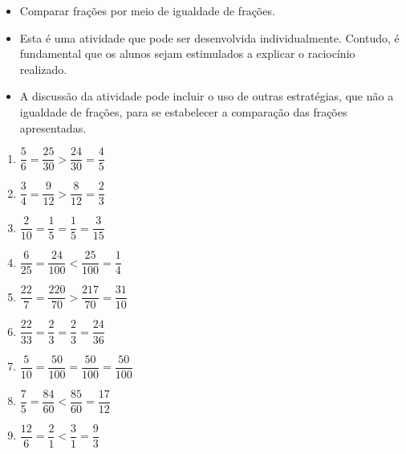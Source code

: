 \begin{atividade}\label{chap4-ativ13}
\objetivos
\begin{itemize} %
    \item       Comparar frações por meio de igualdade de frações.
\end{itemize} %

\discussoes
\begin{itemize} %
    \item       Esta é uma atividade que pode ser desenvolvida individualmente.
Contudo, é fundamental que os alunos sejam estimulados a explicar o raciocínio
realizado.
    \item       A discussão da atividade pode incluir o uso de outras
estratégias, que não a igualdade de frações, para se estabelecer a comparação
das frações apresentadas.
\end{itemize} %


\solucao

\begin{enumerate}
\item $\dfrac{5}{6} = \dfrac{25}{30} > \dfrac{24}{30} =
       \dfrac{4}{5}$

\item $\dfrac{3}{4} = \dfrac{9}{12} > \dfrac{8}{12} =
       \dfrac{2}{3}$

\item $\dfrac{2}{10} = \dfrac{1}{5} = \dfrac{1}{5} =
       \dfrac{3}{15}$

\item $\dfrac{6}{25} = \dfrac{24}{100} < \dfrac{25}{100} =
       \dfrac{1}{4}$

\item $\dfrac{22}{7} = \dfrac{220}{70} > \dfrac{217}{70} =
       \dfrac{31}{10}$

\item $\dfrac{22}{33} = \dfrac{2}{3} = \dfrac{2}{3} =
       \dfrac{24}{36}$

\item $\dfrac{5}{10} = \dfrac{50}{100} = \dfrac{50}{100} =
       \dfrac{50}{100}$

\item $\dfrac{7}{5} = \dfrac{84}{60} < \dfrac{85}{60} =
       \dfrac{17}{12}$

\item $\dfrac{12}{6} = \dfrac{2}{1} < \dfrac{3}{1} =
\dfrac{9}{3}$

\end{enumerate}
\end{atividade}

